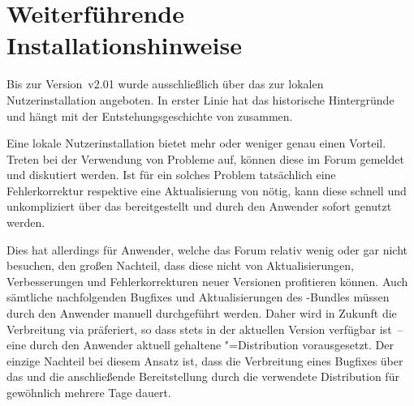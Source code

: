 \chapter{Weiterführende Installationshinweise}
\label{sec:install:ext}
%
\noindent{}

\bigskip\noindent
Bis zur Version~v2.01 wurde \TUDScript ausschließlich über das \Forum zur 
lokalen Nutzerinstallation angeboten. In erster Linie hat das historische 
Hintergründe und hängt mit der Entstehungsgeschichte von \TUDScript zusammen. 

Eine lokale Nutzerinstallation bietet mehr oder weniger genau einen Vorteil. 
Treten bei der Verwendung von \TUDScript Probleme auf, können diese im Forum 
gemeldet und diskutiert werden. Ist für ein solches Problem tatsächlich eine 
Fehlerkorrektur respektive eine Aktualisierung von \TUDScript nötig, kann 
diese schnell und unkompliziert über das \GitHubRepo bereitgestellt und durch 
den Anwender sofort genutzt werden.

Dies hat allerdings für Anwender, welche das Forum relativ wenig oder gar 
nicht besuchen, den großen Nachteil, dass diese nicht von Aktualisierungen, 
Verbesserungen und Fehlerkorrekturen neuer Versionen profitieren können. Auch 
sämtliche nachfolgenden Bugfixes und Aktualisierungen des \TUDScript-Bundles 
müssen durch den Anwender manuell durchgeführt werden. Daher wird in Zukunft 
die Verbreitung via  präferiert, so 
dass \TUDScript stets in der aktuellen Version verfügbar ist~-- eine durch den 
Anwender aktuell gehaltene "=Distribution vorausgesetzt. Der 
einzige Nachteil bei diesem Ansatz ist, dass die Verbreitung eines Bugfixes 
über das  
und die anschließende Bereitstellung durch die verwendete Distribution für 
gewöhnlich mehrere Tage dauert.

